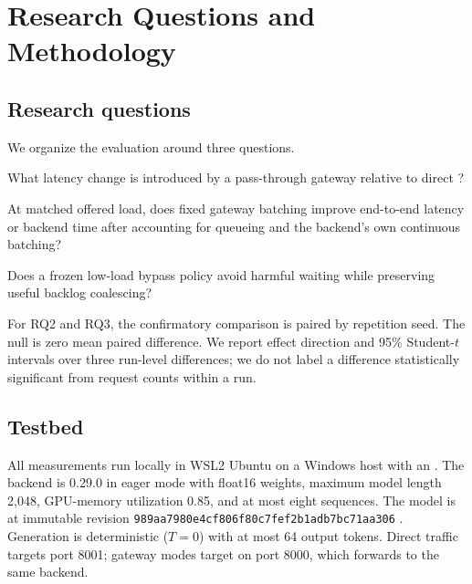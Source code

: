 \section{Research Questions and Methodology}
\label{sec:methodology}

\subsection{Research questions}

We organize the evaluation around three questions.

\begin{description}[leftmargin=3.2em,style=nextline]
  \item[RQ1: Layering cost.] What latency change is introduced by a
        pass-through gateway relative to direct \vllm{}?
  \item[RQ2: Outer batching.] At matched offered load, does fixed gateway
        batching improve end-to-end latency or backend time after accounting
        for queueing and the backend's own continuous batching?
  \item[RQ3: Adaptation.] Does a frozen low-load bypass policy avoid harmful
        waiting while preserving useful backlog coalescing?
\end{description}

For RQ2 and RQ3, the confirmatory comparison is paired by repetition seed.
The null is zero mean paired difference. We report effect direction and 95\%
Student-$t$ intervals over three run-level differences; we do not label a
difference statistically significant from request counts within a run.

\subsection{Testbed}

All measurements run locally in WSL2 Ubuntu on a Windows host with an
\gpu{}. The backend is \vllm{} 0.29.0 in eager mode with float16 weights,
maximum model length 2,048, GPU-memory utilization 0.85, and at most eight
sequences. The model is \model{} at immutable revision
\texttt{989aa7980e4cf806f80c7fef2b1adb7bc71aa306}
\citep{qwen2025technical}. Generation is deterministic
($T=0$) with at most 64 output tokens. Direct traffic targets port 8001;
gateway modes target \adip{} on port 8000, which forwards to the same backend.


